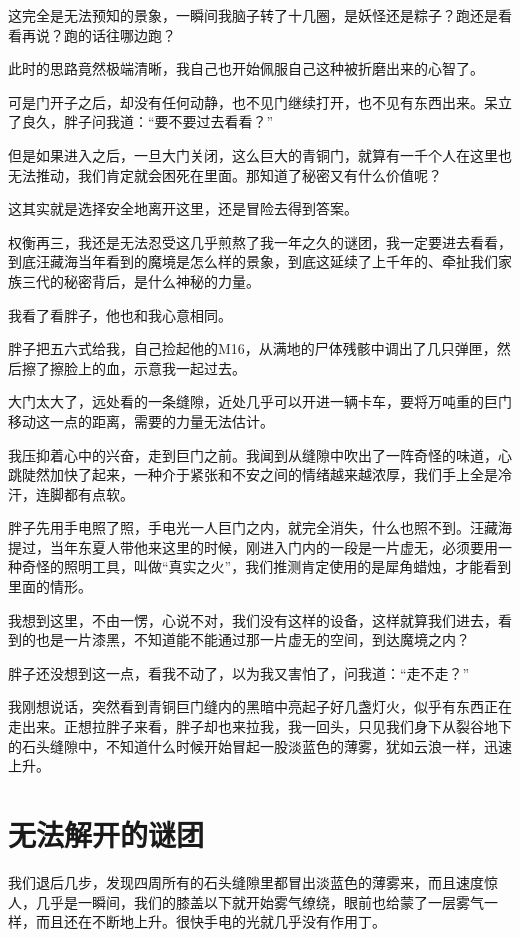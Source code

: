 这完全是无法预知的景象，一瞬间我脑子转了十几圈，是妖怪还是粽子？跑还是看看再说？跑的话往哪边跑？

此时的思路竟然极端清晰，我自己也开始佩服自己这种被折磨出来的心智了。

可是门开子之后，却没有任何动静，也不见门继续打开，也不见有东西出来。呆立了良久，胖子问我道：“要不要过去看看？”

但是如果进入之后，一旦大门关闭，这么巨大的青铜门，就算有一千个人在这里也无法推动，我们肯定就会困死在里面。那知道了秘密又有什么价值呢？

这其实就是选择安全地离开这里，还是冒险去得到答案。

权衡再三，我还是无法忍受这几乎煎熬了我一年之久的谜团，我一定要进去看看，到底汪藏海当年看到的魔境是怎么样的景象，到底这延续了上千年的、牵扯我们家族三代的秘密背后，是什么神秘的力量。

我看了看胖子，他也和我心意相同。

胖子把五六式给我，自己捡起他的M16，从满地的尸体残骸中调出了几只弹匣，然后擦了擦脸上的血，示意我一起过去。

大门太大了，远处看的一条缝隙，近处几乎可以开进一辆卡车，要将万吨重的巨门移动这一点的距离，需要的力量无法估计。

我压抑着心中的兴奋，走到巨门之前。我闻到从缝隙中吹出了一阵奇怪的味道，心跳陡然加快了起来，一种介于紧张和不安之间的情绪越来越浓厚，我们手上全是冷汗，连脚都有点软。

胖子先用手电照了照，手电光一人巨门之内，就完全消失，什么也照不到。汪藏海提过，当年东夏人带他来这里的时候，刚进入门内的一段是一片虚无，必须要用一种奇怪的照明工具，叫做“真实之火”，我们推测肯定使用的是犀角蜡烛，才能看到里面的情形。

我想到这里，不由一愣，心说不对，我们没有这样的设备，这样就算我们进去，看到的也是一片漆黑，不知道能不能通过那一片虚无的空间，到达魔境之内？

胖子还没想到这一点，看我不动了，以为我又害怕了，问我道：“走不走？”

我刚想说话，突然看到青铜巨门缝内的黑暗中亮起子好几盏灯火，似乎有东西正在走出来。正想拉胖子来看，胖子却也来拉我，我一回头，只见我们身下从裂谷地下的石头缝隙中，不知道什么时候开始冒起一股淡蓝色的薄雾，犹如云浪一样，迅速上升。

\chapter{无法解开的谜团}

我们退后几步，发现四周所有的石头缝隙里都冒出淡蓝色的薄雾来，而且速度惊人，几乎是一瞬间，我们的膝盖以下就开始雾气缭绕，眼前也给蒙了一层雾气一样，而且还在不断地上升。很快手电的光就几乎没有作用丁。

